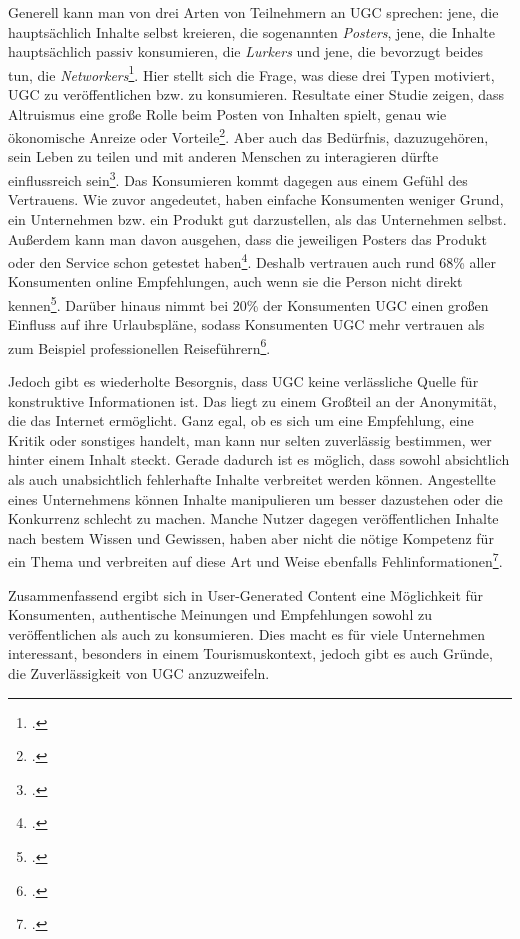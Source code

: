 Generell kann man von drei Arten von Teilnehmern an UGC sprechen: jene, die hauptsächlich Inhalte selbst kreieren, die sogenannten \textit{Posters}, jene, die Inhalte hauptsächlich passiv konsumieren, die \textit{Lurkers} und jene, die bevorzugt beides tun, die \textit{Networkers}\footcite{morrison}. Hier stellt sich die Frage, was diese drei Typen motiviert, UGC zu veröffentlichen bzw. zu konsumieren. Resultate einer Studie zeigen, dass Altruismus eine große Rolle beim Posten von Inhalten spielt, genau wie ökonomische Anreize oder Vorteile\footcite{poch}. Aber auch das Bedürfnis, dazuzugehören, sein Leben zu teilen und mit anderen Menschen zu interagieren dürfte einflussreich sein\footcite{akehurst}. Das Konsumieren kommt dagegen aus einem Gefühl des Vertrauens. Wie zuvor angedeutet, haben einfache Konsumenten weniger Grund, ein Unternehmen bzw. ein Produkt gut darzustellen, als das Unternehmen selbst. Außerdem kann man davon ausgehen, dass die jeweiligen Posters das Produkt oder den Service schon getestet haben\footcite{akehurst}. Deshalb vertrauen auch rund 68\% aller Konsumenten online Empfehlungen, auch wenn sie die Person nicht direkt kennen\footcite{ramirez}. Darüber hinaus nimmt bei 20\% der Konsumenten UGC einen großen Einfluss auf ihre Urlaubspläne, sodass Konsumenten UGC mehr vertrauen als zum Beispiel professionellen Reiseführern\footcite{akehurst}.

Jedoch gibt es wiederholte Besorgnis, dass UGC keine verlässliche Quelle für konstruktive Informationen ist. Das liegt zu einem Großteil an der Anonymität, die das Internet ermöglicht. Ganz egal, ob es sich um eine Empfehlung, eine Kritik oder sonstiges handelt, man kann nur selten zuverlässig bestimmen, wer hinter einem Inhalt steckt. Gerade dadurch ist es möglich, dass sowohl absichtlich als auch unabsichtlich fehlerhafte Inhalte verbreitet werden können. Angestellte eines Unternehmens können Inhalte manipulieren um besser dazustehen oder die Konkurrenz schlecht zu machen. Manche Nutzer dagegen veröffentlichen Inhalte nach bestem Wissen und Gewissen, haben aber nicht die nötige Kompetenz für ein Thema und verbreiten auf diese Art und Weise ebenfalls Fehlinformationen\footcite{chen}.

Zusammenfassend ergibt sich in User-Generated Content eine Möglichkeit für Konsumenten, authentische Meinungen und Empfehlungen sowohl zu veröffentlichen als auch zu konsumieren. Dies macht es für viele Unternehmen interessant, besonders in einem Tourismuskontext, jedoch gibt es auch Gründe, die Zuverlässigkeit von UGC anzuzweifeln.


